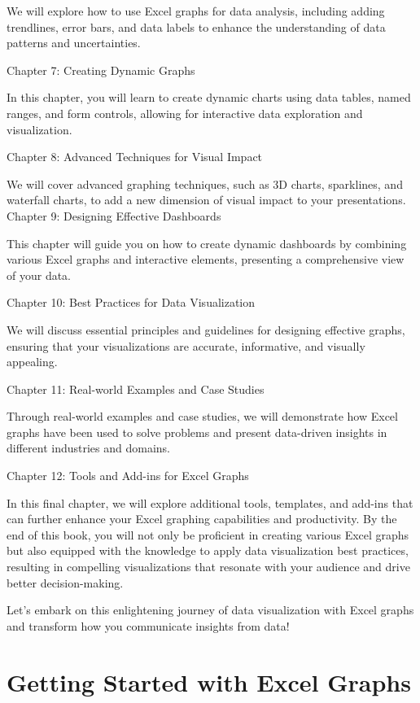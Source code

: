 \documentclass[
]{book}
\begin{document}
We will explore how to use Excel graphs for data analysis, including adding trendlines, error bars, and data labels to enhance the understanding of data patterns and uncertainties.

Chapter 7: Creating Dynamic Graphs

In this chapter, you will learn to create dynamic charts using data tables, named ranges, and form controls, allowing for interactive data exploration and visualization.

Chapter 8: Advanced Techniques for Visual Impact

We will cover advanced graphing techniques, such as 3D charts, sparklines, and waterfall charts, to add a new dimension of visual impact to your presentations.
Chapter 9: Designing Effective Dashboards

This chapter will guide you on how to create dynamic dashboards by combining various Excel graphs and interactive elements, presenting a comprehensive view of your data.

Chapter 10: Best Practices for Data Visualization

We will discuss essential principles and guidelines for designing effective graphs, ensuring that your visualizations are accurate, informative, and visually appealing.

Chapter 11: Real-world Examples and Case Studies

Through real-world examples and case studies, we will demonstrate how Excel graphs have been used to solve problems and present data-driven insights in different industries and domains.

Chapter 12: Tools and Add-ins for Excel Graphs

In this final chapter, we will explore additional tools, templates, and add-ins that can further enhance your Excel graphing capabilities and productivity.
By the end of this book, you will not only be proficient in creating various Excel graphs but also equipped with the knowledge to apply data visualization best practices, resulting in compelling visualizations that resonate with your audience and drive better decision-making.

Let's embark on this enlightening journey of data visualization with Excel graphs and transform how you communicate insights from data!

\hypertarget{getting-started-with-excel-graphs}{%
\chapter{Getting Started with Excel Graphs}\label{getting-started-with-excel-graphs}}
\end{document}
